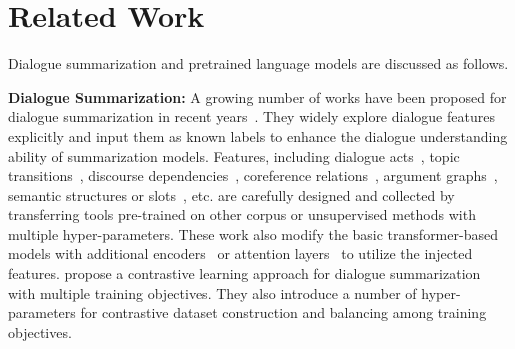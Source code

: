\section{Related Work}
\label{sec:relatedwork}

Dialogue summarization and pretrained language models are discussed as follows.


\textbf{Dialogue Summarization:} A growing number of works have been proposed for dialogue summarization in recent years~\cite{feng2021survey}. 
They widely explore dialogue features explicitly and input them as known labels to enhance the dialogue understanding ability of summarization models.
Features, including dialogue acts~\cite{goo2018abstractive}, topic transitions~\cite{chen2020multi}, discourse dependencies~\cite{chen2021structure}, coreference relations~\cite{liu2021coreference}, argument graphs~\cite{fabbri2021convosumm}, semantic structures or slots~\cite{lei-etal-2021-finer-grain,zhao-etal-2021-give-truth}, etc. are carefully designed and collected by transferring tools pre-trained on other corpus or unsupervised methods with multiple hyper-parameters. 
These work also modify the basic transformer-based models with additional encoders~\cite{chen2020multi} or attention layers~\cite{chen2021structure,liu2021coreference,lei-etal-2021-finer-grain,zhao-etal-2021-give-truth} to utilize the injected features.
\citet{liu-etal-2021-topic-aware} propose a contrastive learning approach for dialogue summarization with multiple training objectives. They also introduce a number of hyper-parameters for contrastive dataset construction and balancing among training objectives.



